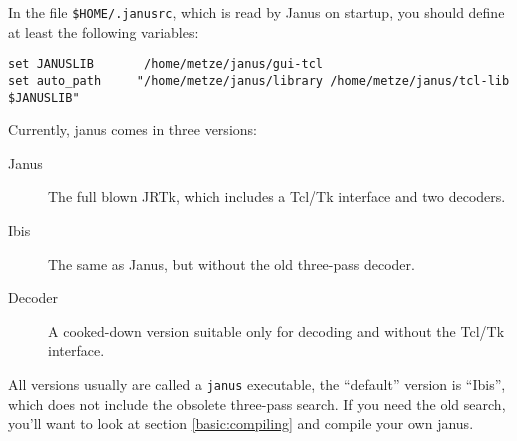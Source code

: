 In the file \texttt{\${HOME}/.janusrc}, which is read by Janus on
startup, you should define at least the following variables:

\begin{verbatim}
set JANUSLIB       /home/metze/janus/gui-tcl
set auto_path     "/home/metze/janus/library /home/metze/janus/tcl-lib $JANUSLIB"
\end{verbatim}

Currently, janus comes in three versions:

\begin{description}
\item[Janus]   The full blown JRTk, which includes a Tcl/Tk interface and two decoders.
\item[Ibis]    The same as Janus, but without the old three-pass decoder.
\item[Decoder] A cooked-down version suitable only for decoding and without the Tcl/Tk interface.
\end{description}

All versions    usually are called   a  \texttt{janus} executable, the
``default''  version is ``Ibis'', which  does not include the obsolete
three-pass search.  If you need the old search, you'll want to look at
section \ref{basic:compiling} and compile your own janus.

